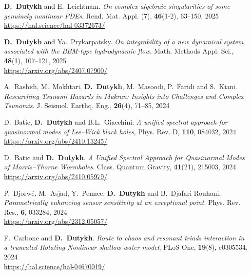 \documentclass[final, a4paper, oneside, 12pt]{article}
\numberwithin{equation}{section}
\begin{document}
\begin{etaremune}
  \item \textbf{D.~Dutykh} and E.~Leichtnam. \textit{On complex algebraic singularities of some genuinely nonlinear PDEs}. Rend. Mat. Appl. (7), \textbf{46}(1-2), 63--150, 2025 \\ %
  \url{https://hal.science/hal-03372673/}

  \item \textbf{D.~Dutykh} and Ya.~Prykarpatsky. \textit{On integrability of a new dynamical system associated with the BBM-type hydrodynamic flow}, Math. Methods Appl. Sci., \textbf{48}(1), 107--121, 2025 \\ %
  \url{https://arxiv.org/abs/2407.07900/}



  \item A.~Rashidi, M.~Mokhtari, \textbf{D.~Dutykh}, M.~Masoodi, P.~Faridi and S.~Kiani. \textit{Researching Tsunami Hazards in Makran: Insights into Challenges and Complex Tsunamis}. J. Seismol. Earthq. Eng., \textbf{26}(4), 71--85, 2024 %

  \item D.~Batic, \textbf{D.~Dutykh} and B.L.~Giacchini. \textit{A unified spectral approach for quasinormal modes of Lee--Wick black holes}, Phys. Rev. D, \textbf{110}, 084032, 2024 \\ %
  \url{https://arxiv.org/abs/2410.13245/}

  \item D.~Batic and \textbf{D.~Dutykh}. \textit{A Unified Spectral Approach for Quasinormal Modes of Morris--Thorne Wormholes}. Class. Quantum Gravity, \textbf{41}(21), 215003, 2024 \\ %
  \url{https://arxiv.org/abs/2410.05979/}

  \item P.~Djorw\'e, M.~Asjad, Y.~Pennec, \textbf{D.~Dutykh} and B.~Djafari-Rouhani. \textit{Parametrically enhancing sensor sensitivity at an exceptional point}. Phys. Rev. Res., \textbf{6}, 033284, 2024 \\ %
  \url{https://arxiv.org/abs/2312.05057/}
  
  \item F.~Carbone and \textbf{D.~Dutykh}. \textit{Route to chaos and resonant triads interaction in a truncated Rotating Nonlinear shallow-water model}, PLoS One, \textbf{19}(8), e0305534, 2024 \\ %
  \url{https://hal.science/hal-04670019/}


\end{etaremune}
\end{document}
